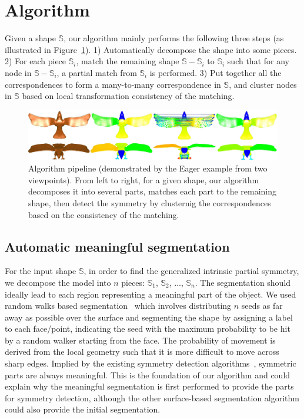 \section{Algorithm}
\label{sec:alg}

Given a shape $\mathbb{S}$, our algorithm mainly performs the following three steps (as illustrated in Figure~\ref{fig:Eager}). 1) Automatically decompose the shape into some pieces. 2) For each piece $\mathbb{S}_i$, match the remaining shape $\mathbb{S}-\mathbb{S}_i$ to $\mathbb{S}_i$ such that for any node in  $\mathbb{S}-\mathbb{S}_i$, a partial match from $\mathbb{S}_i$ is performed. 3) Put together all the correspondences to form a many-to-many correspondence in $\mathbb{S}$, and cluster nodes in $\mathbb{S}$ based on local transformation consistency of the matching.

\begin{figure}[t!]
\centering
  \includegraphics[width=0.99\linewidth]{figures/pipe.pdf}
  \caption{Algorithm pipeline (demonstrated by the Eager example from two viewpoints).
  From left to right, for a given shape, our algorithm decomposes it into several parts, matches each part to the remaining shape, then detect the symmetry by clusternig the correspondences based on the consistency of the matching. }
\label{fig:Eager}
\end{figure}

\subsection{Automatic meaningful segmentation}
\label{subsec:segmentation}

For the input shape $\mathbb{S}$, in order to find the generalized intrinsic partial symmetry, we decompose the model into $n$ pieces: $\mathbb{S}_1$, $\mathbb{S}_2$, $\dots$, $\mathbb{S}_n$.
The segmentation should ideally lead to each region representing a meaningful part of the object. We used random walks based segmentation~\cite{lai2009} which involves distributing $n$ seeds as far away as possible over the surface and segmenting the shape by assigning a label to each face/point, indicating the seed with the maximum probability to be hit by a random walker starting from the face. The probability of movement is derived from the local geometry such that it is more difficult to move across sharp edges. Implied by the existing symmetry detection algorithms~\cite{xu2009,berner2011}, symmetric parts are always meaningful. This is the foundation of our algorithm and could explain why the meaningful segmentation is first performed to provide the parts for symmetry detection, although the other surface-based segmentation algorithm could also provide the initial segmentation.

